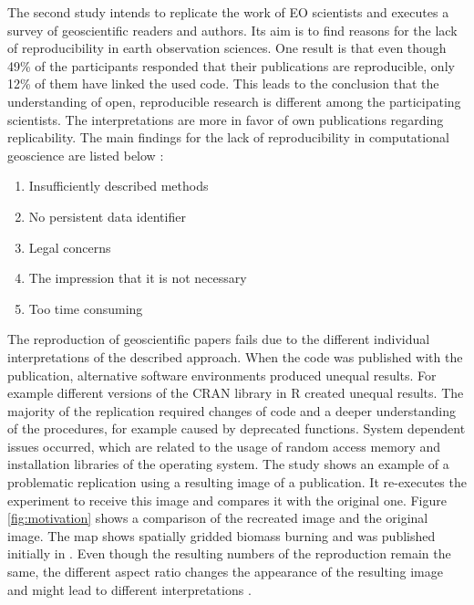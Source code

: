 \documentclass[draft,final]{vutinfth} %
\begin{document}
The second study intends to replicate the work of EO scientists and executes a survey of geoscientific readers and authors. Its aim is to find reasons for the lack of reproducibility in earth observation sciences. One result is that even though 49\% of the participants responded that their publications are reproducible, only 12\% of them have linked the used code. This leads to the conclusion that the understanding of open, reproducible research is different among the participating scientists. The interpretations are more in favor of own publications regarding replicability. The main findings for the lack of reproducibility in computational geoscience are listed below \cite{Thestateofreproducibility}:  

\begin{enumerate}
	\item Insufficiently described methods 
	\item No persistent data identifier
	\item Legal concerns
	\item The impression that it is not necessary
	\item Too {t}ime consuming
\end{enumerate} 

The reproduction of geoscientific papers fails due to the different individual interpretations of the described approach. When the code was published with the publication, alternative software environments produced unequal results. For example different versions of the CRAN library in R created unequal results. The majority of the replication required changes of code and a deeper understanding of the procedures, for example caused by deprecated functions. System dependent issues occurred, which are related to the usage of random access memory and installation libraries of the operating system. 
The study shows an example of a problematic replication using a resulting image of a publication.
It re-executes the experiment to receive this image and compares it with the original one. Figure \ref{fig:motivation} shows a comparison of the recreated image and the original image. The map shows spatially gridded biomass burning and was published initially in \cite{bg-13-3225-2016}. Even though the resulting numbers of the reproduction remain the same, the different aspect ratio changes the appearance of the resulting image and might lead to different interpretations \cite{Thestateofreproducibility}.
\end{document}
